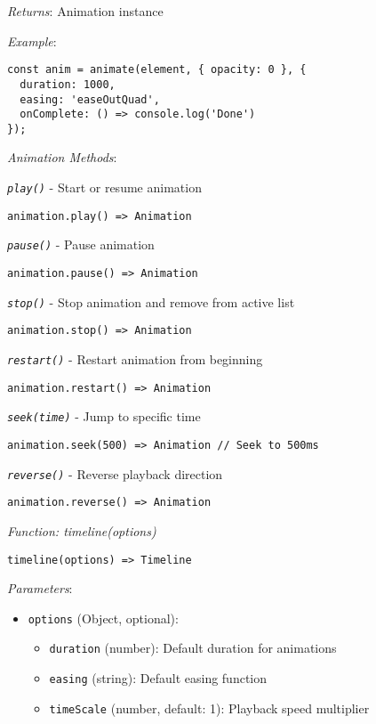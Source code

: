 \documentclass[11pt]{article}
\begin{document}
\emph{Returns}: Animation instance

\emph{Example}:
\begin{verbatim}
const anim = animate(element, { opacity: 0 }, {
  duration: 1000,
  easing: 'easeOutQuad',
  onComplete: () => console.log('Done')
});
\end{verbatim}

\emph{Animation Methods}:

\emph{\texttt{play()}} - Start or resume animation
\begin{verbatim}
animation.play() => Animation
\end{verbatim}

\emph{\texttt{pause()}} - Pause animation
\begin{verbatim}
animation.pause() => Animation
\end{verbatim}

\emph{\texttt{stop()}} - Stop animation and remove from active list
\begin{verbatim}
animation.stop() => Animation
\end{verbatim}

\emph{\texttt{restart()}} - Restart animation from beginning
\begin{verbatim}
animation.restart() => Animation
\end{verbatim}

\emph{\texttt{seek(time)}} - Jump to specific time
\begin{verbatim}
animation.seek(500) => Animation // Seek to 500ms
\end{verbatim}

\emph{\texttt{reverse()}} - Reverse playback direction
\begin{verbatim}
animation.reverse() => Animation
\end{verbatim}

\emph{Function: timeline(options)}

\begin{verbatim}
timeline(options) => Timeline
\end{verbatim}

\emph{Parameters}:
\begin{itemize}
\item \texttt{options} (Object, optional):
\begin{itemize}
\item \texttt{duration} (number): Default duration for animations
\item \texttt{easing} (string): Default easing function
\item \texttt{timeScale} (number, default: 1): Playback speed multiplier
\end{itemize}
\end{itemize}
\end{document}
